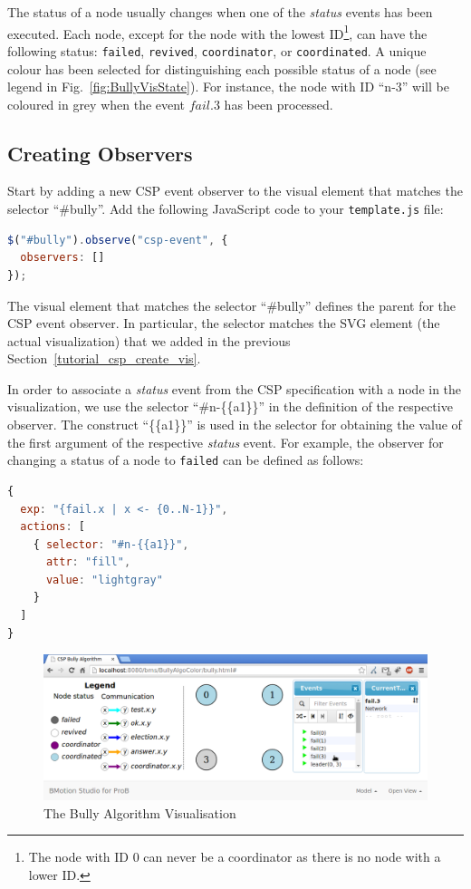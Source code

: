 The status of a node usually changes when one of the \textit{status} events has been executed.
Each node, except for the node with the lowest ID\footnote{The node with ID 0 can never be a coordinator as there is no node with a lower ID.}, can have the following status: \texttt{failed}, \texttt{revived}, \texttt{coordinator}, or \texttt{coordinated}.
A unique colour has been selected for distinguishing each possible status of a node (see legend in Fig.~\ref{fig:BullyVisState}).
For instance, the node with ID ``n-3'' will be coloured in grey when the event $fail.3$ has been processed.

\subsection{Creating Observers}

Start by adding a new CSP event observer to the visual element that matches the selector ``\#bully''.
Add the following JavaScript code to your \texttt{template.js} file:

\begin{lstlisting}[language=JavaScript]
$("#bully").observe("csp-event", {
  observers: []
});
\end{lstlisting}

The visual element that matches the selector ``\#bully'' defines the parent for the CSP event observer.
In particular, the selector matches the SVG element (the actual visualization) that we added in the previous Section~\ref{tutorial_csp_create_vis}.

In order to associate a \textit{status} event from the CSP specification with a node in the visualization, we use the selector ``\#n-\{\{a1\}\}'' in the definition of the respective observer. 
The construct ``\{\{a1\}\}'' is used in the selector for obtaining the value of the first argument of the respective \textit{status} event.
For example, the observer for changing a status of a node to \texttt{failed} can be defined as follows:

\begin{lstlisting}[language=JavaScript]
{
  exp: "{fail.x | x <- {0..N-1}}",
  actions: [
    { selector: "#n-{{a1}}",
      attr: "fill",
      value: "lightgray"
    }
  ]
}
\end{lstlisting}

\begin{figure}[h!]\centering
	\includegraphics[width=16cm]{img/tutorial/bully1}
	\caption{The Bully Algorithm Visualisation}
	\label{fig:bully1}
\end{figure}

